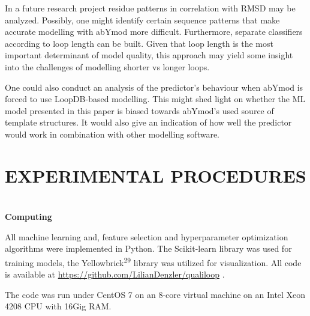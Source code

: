 \documentclass[
]{article}
\begin{document}
In a future research project residue patterns in correlation with RMSD
may be analyzed. Possibly, one might identify certain sequence patterns
that make accurate modelling with abYmod more difficult. Furthermore,
separate classifiers according to loop length can be built. Given that
loop length is the most important determinant of model quality, this
approach may yield some insight into the challenges of modelling shorter
vs longer loops.

One could also conduct an analysis of the predictor's behaviour when
abYmod is forced to use LoopDB-based modelling. This might shed light on
whether the ML model presented in this paper is biased towards abYmod's
used source of template structures. It would also give an indication of
how well the predictor would work in combination with other modelling
software.

\hypertarget{experimental-procedures}{%
\section{EXPERIMENTAL PROCEDURES}\label{experimental-procedures}}

\hypertarget{section-2}{%
\section{}\label{section-2}}

\textbf{Computing}

All machine learning and, feature selection and hyperparameter
optimization algorithms were implemented in Python. The Scikit-learn
library was used for training models, the
Yellowbrick\textsuperscript{29} library was utilized for visualization.
All code is available at
\url{https://github.com/LilianDenzler/qualiloop} .

The code was run under CentOS 7 on an 8-core virtual machine on an Intel
Xeon 4208 CPU with 16Gig RAM.
\end{document}
